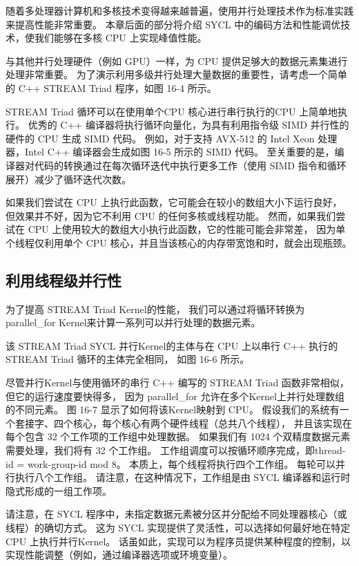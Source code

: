 随着多处理器计算机和多核技术变得越来越普遍，使用并行处理技术作为标准实践来提高性能非常重要。 
本章后面的部分将介绍 SYCL 中的编码方法和性能调优技术，使我们能够在多核 CPU 上实现峰值性能。

与其他并行处理硬件（例如 GPU）一样，为 CPU 提供足够大的数据元素集进行处理非常重要。 
为了演示利用多级并行处理大量数据的重要性，请考虑一个简单的 C++ STREAM Triad 程序，如图 16-4 所示。

STREAM Triad 循环可以在使用单个CPU 核心进行串行执行的CPU 上简单地执行。 
优秀的 C++ 编译器将执行循环向量化，为具有利用指令级 SIMD 并行性的硬件的 CPU 生成 SIMD 代码。 
例如，对于支持 AVX-512 的 Intel Xeon 处理器，Intel C++ 编译器会生成如图 16-5 所示的 SIMD 代码。 
至关重要的是，编译器对代码的转换通过在每次循环迭代中执行更多工作（使用 SIMD 指令和循环展开）减少了循环迭代次数。

如果我们尝试在 CPU 上执行此函数，它可能会在较小的数组大小下运行良好，
但效果并不好，因为它不利用 CPU 的任何多核或线程功能。 
然而，如果我们尝试在 CPU 上使用较大的数组大小执行此函数，它的性能可能会非常差，
因为单个线程仅利用单个 CPU 核心，并且当该核心的内存带宽饱和时，就会出现瓶颈。

\subsection{利用线程级并行性}
为了提高 STREAM Triad Kernel的性能，
我们可以通过将循环转换为 parallel\_for Kernel来计算一系列可以并行处理的数据元素。

该 STREAM Triad SYCL 并行Kernel的主体与在 CPU 上以串行 C++ 执行的 STREAM Triad 循环的主体完全相同，
如图 16-6 所示。

尽管并行Kernel与使用循环的串行 C++ 编写的 STREAM Triad 函数非常相似，但它的运行速度要快得多，
因为 parallel\_for 允许在多个Kernel上并行处理数组的不同元素。 
图 16-7 显示了如何将该Kernel映射到 CPU。 
假设我们的系统有一个套接字、四个核心，每个核心有两个硬件线程（总共八个线程），
并且该实现在每个包含 32 个工作项的工作组中处理数据。 
如果我们有 1024 个双精度数据元素需要处理，我们将有 32 个工作组。 
工作组调度可以按循环顺序完成，即thread-id = work-group-id mod 8。
本质上，每个线程将执行四个工作组。 每轮可以并行执行八个工作组。 
请注意，在这种情况下，工作组是由 SYCL 编译器和运行时隐式形成的一组工作项。

请注意，在 SYCL 程序中，未指定数据元素被分区并分配给不同处理器核心（或线程）的确切方式。 
这为 SYCL 实现提供了灵活性，可以选择如何最好地在特定 CPU 上执行并行Kernel。 
话虽如此，实现可以为程序员提供某种程度的控制，以实现性能调整（例如，通过编译器选项或环境变量）。

